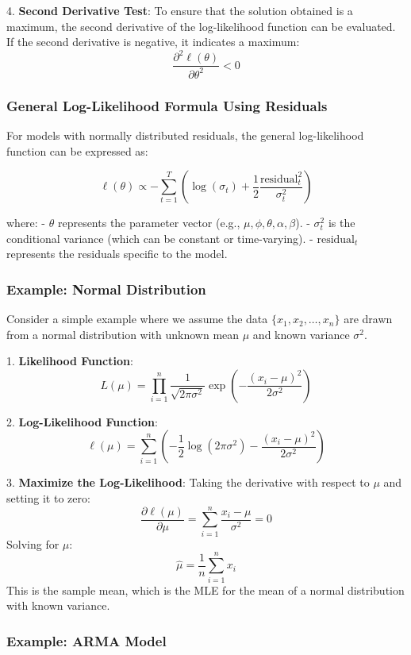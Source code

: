 4. \textbf{Second Derivative Test}:
   To ensure that the solution obtained is a maximum, the second derivative of the log-likelihood function can be evaluated. If the second derivative is negative, it indicates a maximum:
   \[
   \frac{\partial^2 \ell(\theta)}{\partial \theta^2} < 0
   \]

\subsubsection*{General Log-Likelihood Formula Using Residuals}

For models with normally distributed residuals, the general log-likelihood function can be expressed as:

\[ \ell(\theta) \propto -\sum_{t=1}^{T} \left( \log(\sigma_t) + \frac{1}{2} \frac{\text{residual}_t^2}{\sigma_t^2} \right) \]

where:
- \(\theta\) represents the parameter vector (e.g., \(\mu, \phi, \theta, \alpha, \beta\)).
- \(\sigma_t^2\) is the conditional variance (which can be constant or time-varying).
- \(\text{residual}_t\) represents the residuals specific to the model.

\subsubsection*{Example: Normal Distribution}

Consider a simple example where we assume the data \(\{x_1, x_2, \ldots, x_n\}\) are drawn from a normal distribution with unknown mean \(\mu\) and known variance \(\sigma^2\).

1. \textbf{Likelihood Function}:
   \[
   L(\mu) = \prod_{i=1}^n \frac{1}{\sqrt{2\pi\sigma^2}} \exp\left(-\frac{(x_i - \mu)^2}{2\sigma^2}\right)
   \]

2. \textbf{Log-Likelihood Function}:
   \[
   \ell(\mu) = \sum_{i=1}^n \left( -\frac{1}{2} \log(2\pi\sigma^2) - \frac{(x_i - \mu)^2}{2\sigma^2} \right)
   \]

3. \textbf{Maximize the Log-Likelihood}:
   Taking the derivative with respect to \(\mu\) and setting it to zero:
   \[
   \frac{\partial \ell(\mu)}{\partial \mu} = \sum_{i=1}^n \frac{x_i - \mu}{\sigma^2} = 0
   \]
   Solving for \(\mu\):
   \[
   \hat{\mu} = \frac{1}{n} \sum_{i=1}^n x_i
   \]
   This is the sample mean, which is the MLE for the mean of a normal distribution with known variance.

\subsubsection*{Example: ARMA Model}

